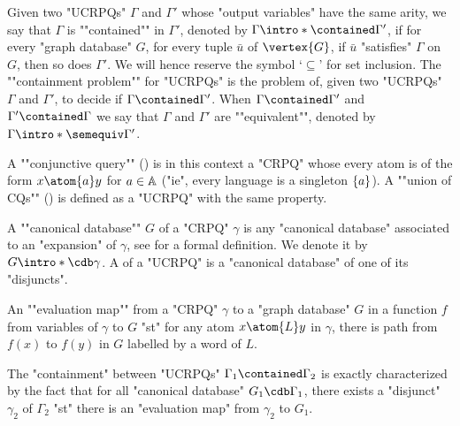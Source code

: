 \AP Given two "UCRPQs" $\Gamma$
and $\Gamma'$ whose "output variables" have the same arity,
we say that $\Gamma$ is \AP""contained"" in $\Gamma'$,
denoted by $\Gamma \intro*\contained \Gamma'$, if
for every "graph database" $G$, for every tuple $\bar u$ of $\vertex{G}$,
if $\bar u$ "satisfies" $\Gamma$ on $G$, then so does $\Gamma'$. We will hence reserve the symbol `$\subseteq$' for set inclusion.
The \AP""containment problem"" for "UCRPQs" is the problem of, given
two "UCRPQs" $\Gamma$ and $\Gamma'$, to decide if $\Gamma \contained \Gamma'$.
When $\Gamma \contained \Gamma'$ and $\Gamma' \contained \Gamma$  we say that
$\Gamma$ and $\Gamma'$ are \AP""equivalent"", denoted by
$\Gamma \intro*\semequiv \Gamma'$. 

\AP A ""conjunctive query"" () is in this context a "CRPQ" whose every atom is of the form $x \atom{a} y$ for $a \in \mathbb{A}$ ("ie", every language is a singleton $\{a\}$).
\AP A ""union of CQs"" () is defined as a "UCRPQ" with the same property.

A \AP""canonical database"" $G$ of a "CRPQ" $\gamma$ is any "canonical database" associated
to an "expansion" of $\gamma$, see \cite[Definition 3.1]{FlorescuLevySuciu1998Containment}
for a formal definition. We denote it by \AP$G \intro*\cdb \gamma$.
A  of a "UCRPQ" is a "canonical database" of one
of its "disjuncts".

An \AP""evaluation map"" from a "CRPQ" $\gamma$ to a "graph database" $G$
in a function $f$ from variables of $\gamma$ to $G$ "st"
for any atom $x \atom{L} y$ in $\gamma$, there is path from $f(x)$ to $f(y)$ in $G$
labelled by a word of $L$.

The "containment" between "UCRPQs" $\Gamma_1 \contained \Gamma_2$ is exactly characterized
by the fact that for all "canonical database" $G_1 \cdb \Gamma_1$,
there exists a "disjunct" $\gamma_2$ of $\Gamma_2$ "st" there is an "evaluation map"
from $\gamma_2$ to $G_1$.

